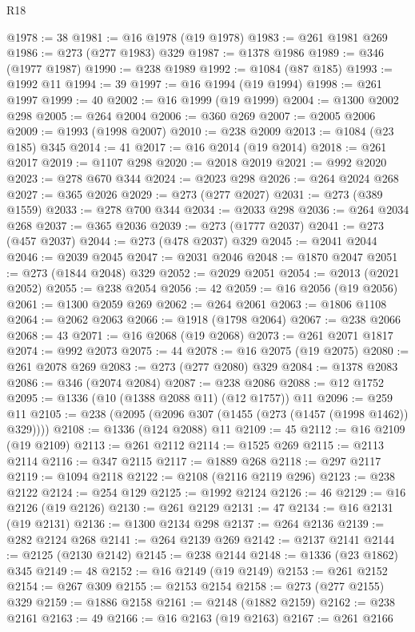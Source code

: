\begin{lexlean}{R18}
\begin{coremodule}
{{{{{{{{{{{{{{{{{{{@1978 := 38
@1981 := @16 @1978 (@19 @1978)
@1983 := @261 @1981 @269
@1986 := @273 (@277 @1983) @329
@1987 := @1378 @1986
@1989 := @346 (@1977 @1987)
@1990 := @238 @1989
@1992 := @1084 (@87 @185)
@1993 := @1992 @11
@1994 := 39
@1997 := @16 @1994 (@19 @1994)
@1998 := @261 @1997
@1999 := 40
@2002 := @16 @1999 (@19 @1999)
@2004 := @1300 @2002 @298
@2005 := @264 @2004
@2006 := @360 @269
@2007 := @2005 @2006
@2009 := @1993 (@1998 @2007)
@2010 := @238 @2009
@2013 := @1084 (@23 @185) @345
@2014 := 41
@2017 := @16 @2014 (@19 @2014)
@2018 := @261 @2017
@2019 := @1107 @298
@2020 := @2018 @2019
@2021 := @992 @2020
@2023 := @278 @670 @344
@2024 := @2023 @298
@2026 := @264 @2024 @268
@2027 := @365 @2026
@2029 := @273 (@277 @2027)
@2031 := @273 (@389 @1559)
@2033 := @278 @700 @344
@2034 := @2033 @298
@2036 := @264 @2034 @268
@2037 := @365 @2036
@2039 := @273 (@1777 @2037)
@2041 := @273 (@457 @2037)
@2044 := @273 (@478 @2037) @329
@2045 := @2041 @2044
@2046 := @2039 @2045
@2047 := @2031 @2046
@2048 := @1870 @2047
@2051 := @273 (@1844 @2048) @329
@2052 := @2029 @2051
@2054 := @2013 (@2021 @2052)
@2055 := @238 @2054
@2056 := 42
@2059 := @16 @2056 (@19 @2056)
@2061 := @1300 @2059 @269
@2062 := @264 @2061
@2063 := @1806 @1108
@2064 := @2062 @2063
@2066 := @1918 (@1798 @2064)
@2067 := @238 @2066
@2068 := 43
@2071 := @16 @2068 (@19 @2068)
@2073 := @261 @2071 @1817
@2074 := @992 @2073
@2075 := 44
@2078 := @16 @2075 (@19 @2075)
@2080 := @261 @2078 @269
@2083 := @273 (@277 @2080) @329
@2084 := @1378 @2083
@2086 := @346 (@2074 @2084)
@2087 := @238 @2086
@2088 := @12 @1752
@2095 := @1336 (@10 (@1388 @2088 @11) (@12 @1757)) @11
@2096 := @259 @11
@2105 := @238 (@2095 (@2096 @307 (@1455 (@273 (@1457 (@1998 @1462)) @329))))
@2108 := @1336 (@124 @2088) @11
@2109 := 45
@2112 := @16 @2109 (@19 @2109)
@2113 := @261 @2112
@2114 := @1525 @269
@2115 := @2113 @2114
@2116 := @347 @2115
@2117 := @1889 @268
@2118 := @297 @2117
@2119 := @1094 @2118
@2122 := @2108 (@2116 @2119 @296)
@2123 := @238 @2122
@2124 := @254 @129
@2125 := @1992 @2124
@2126 := 46
@2129 := @16 @2126 (@19 @2126)
@2130 := @261 @2129
@2131 := 47
@2134 := @16 @2131 (@19 @2131)
@2136 := @1300 @2134 @298
@2137 := @264 @2136
@2139 := @282 @2124 @268
@2141 := @264 @2139 @269
@2142 := @2137 @2141
@2144 := @2125 (@2130 @2142)
@2145 := @238 @2144
@2148 := @1336 (@23 @1862) @345
@2149 := 48
@2152 := @16 @2149 (@19 @2149)
@2153 := @261 @2152
@2154 := @267 @309
@2155 := @2153 @2154
@2158 := @273 (@277 @2155) @329
@2159 := @1886 @2158
@2161 := @2148 (@1882 @2159)
@2162 := @238 @2161
@2163 := 49
@2166 := @16 @2163 (@19 @2163)
@2167 := @261 @2166
}}}}}}}}}}}}}}}}}}}
\end{coremodule}
\end{lexlean}
